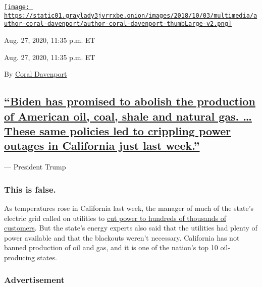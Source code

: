 \href{https://www.nytimes3xbfgragh.onion/by/coral-davenport}{\texttt{[image: https://static01.graylady3jvrrxbe.onion/images/2018/10/03/multimedia/author-coral-davenport/author-coral-davenport-thumbLarge-v2.png]}}

Aug. 27, 2020, 11:35 p.m. ET

Aug. 27, 2020, 11:35 p.m. ET

By \href{https://www.nytimes3xbfgragh.onion/by/coral-davenport}{Coral
Davenport}

\hypertarget{biden-has-promised-to-abolish-the-production-of-american-oil-coal-shale-and-natural-gas--these-same-policies-led-to-crippling-power-outages-in-california-just-last-week}{%
\subsection{\texorpdfstring{\protect\hyperlink{biden-has-promised-to-abolish-the-production-of-american-oil-coal-shale-and-natural-gas-these-same-policies-led-to-crippling-pow}{``Biden
has promised to abolish the production of American oil, coal, shale and
natural gas. \ldots{} These same policies led to crippling power outages
in California just last
week.''}}{``Biden has promised to abolish the production of American oil, coal, shale and natural gas. \ldots{} These same policies led to crippling power outages in California just last week.''}}\label{biden-has-promised-to-abolish-the-production-of-american-oil-coal-shale-and-natural-gas--these-same-policies-led-to-crippling-power-outages-in-california-just-last-week}}

--- President Trump

\hypertarget{this-is-false}{%
\subsubsection{This is false.}\label{this-is-false}}

As temperatures rose in California last week, the manager of much of the
state's electric grid called on utilities to
\href{https://slack-redir.net/link?url=https\%3A\%2F\%2Fwww.nytimes3xbfgragh.onion\%2F2020\%2F08\%2F16\%2Fbusiness\%2Fcalifornia-blackouts.html}{cut
power to hundreds of thousands of customers}. But the state's energy
experts also said that the utilities had plenty of power available and
that the blackouts weren't necessary. California has not banned
production of oil and gas, and it is one of the nation's top 10
oil-producing states.

\hypertarget{advertisement-1}{%
\subsubsection{Advertisement}\label{advertisement-1}}

